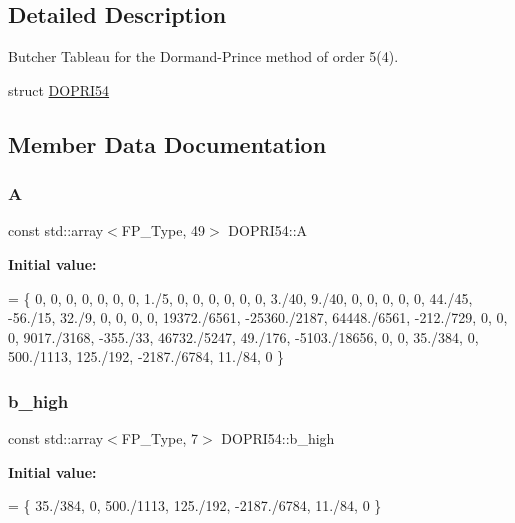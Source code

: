 \subsection{Detailed Description}
Butcher Tableau for the Dormand-\/\+Prince method of order 5(4). 

struct \hyperlink{structDOPRI54}{D\+O\+P\+R\+I54} 

\subsection{Member Data Documentation}
\mbox{\label{structDOPRI54_a12a69b426524b011c7cb1c5be7aba756}} 
\subsubsection{\texorpdfstring{A}{A}}
{\footnotesize\ttfamily const std\+::array$<$F\+P\+\_\+\+Type, 49$>$ D\+O\+P\+R\+I54\+::A}

{\bfseries Initial value\+:}
\begin{DoxyCode}
= \{
    0,            0,             0,            0,          0,             0,       0,
    1./5,         0,             0,            0,          0,             0,       0,
    3./40,        9./40,         0,            0,          0,             0,       0,
    44./45,       -56./15,       32./9,        0,          0,             0,       0,
    19372./6561,  -25360./2187,  64448./6561,  -212./729,  0,             0,       0,
    9017./3168,   -355./33,      46732./5247,  49./176,    -5103./18656,  0,       0,
    35./384,      0,             500./1113,    125./192,   -2187./6784,   11./84,  0
  \}
\end{DoxyCode}
\mbox{\label{structDOPRI54_a0f82be4621ccdb66b90c921f1574b946}} 
\subsubsection{\texorpdfstring{b\+\_\+high}{b\_high}}
{\footnotesize\ttfamily const std\+::array$<$F\+P\+\_\+\+Type, 7$>$ D\+O\+P\+R\+I54\+::b\+\_\+high}

{\bfseries Initial value\+:}
\begin{DoxyCode}
= \{
    35./384, 0, 500./1113, 125./192, -2187./6784, 11./84, 0
  \}
\end{DoxyCode}
\mbox{\label{structDOPRI54_a5b2e88487f09bc254164b76669a9d31d}} 
